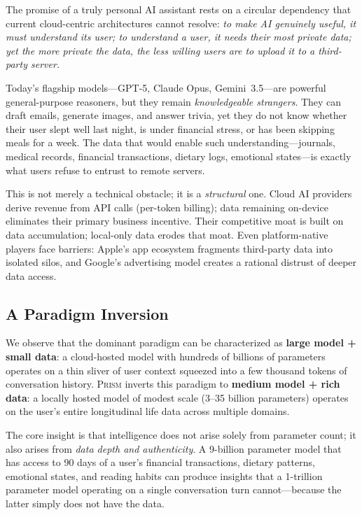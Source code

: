 \documentclass[11pt,a4paper]{article}
\newcommand{\echostream}{\textsc{Prism}}
\begin{document}
The promise of a truly personal AI assistant rests on a circular dependency
that current cloud-centric architectures cannot resolve: \emph{to make AI
genuinely useful, it must understand its user; to understand a user, it needs
their most private data; yet the more private the data, the less willing users
are to upload it to a third-party server.}

Today's flagship models---GPT-5, Claude Opus, Gemini~3.5---are powerful
general-purpose reasoners, but they remain \emph{knowledgeable strangers}.
They can draft emails, generate images, and answer trivia, yet they do not
know whether their user slept well last night, is under financial stress, or
has been skipping meals for a week. The data that would enable such
understanding---journals, medical records, financial transactions, dietary
logs, emotional states---is exactly what users refuse to entrust to remote
servers.

This is not merely a technical obstacle; it is a \emph{structural} one. Cloud
AI providers derive revenue from API calls (per-token billing); data remaining
on-device eliminates their primary business incentive. Their competitive moat
is built on data accumulation; local-only data erodes that moat. Even
platform-native players face barriers: Apple's app ecosystem fragments
third-party data into isolated silos, and Google's advertising model creates a
rational distrust of deeper data access.

\subsection{A Paradigm Inversion}

We observe that the dominant paradigm can be characterized as \textbf{large
model + small data}: a cloud-hosted model with hundreds of billions of
parameters operates on a thin sliver of user context squeezed into a few
thousand tokens of conversation history. \echostream{} inverts this paradigm
to \textbf{medium model + rich data}: a locally hosted model of modest scale
(3--35 billion parameters) operates on the user's entire longitudinal life
data across multiple domains.

The core insight is that intelligence does not arise solely from parameter
count; it also arises from \emph{data depth and authenticity}. A 9-billion
parameter model that has access to 90 days of a user's financial transactions,
dietary patterns, emotional states, and reading habits can produce insights
that a 1-trillion parameter model operating on a single conversation turn
cannot---because the latter simply does not have the data.
\end{document}
